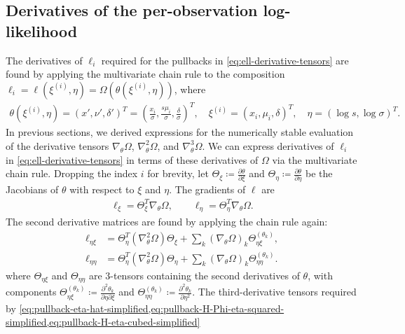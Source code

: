 \documentclass{article}
\begin{document}
\subsection{Derivatives of the per-observation log-likelihood}

The derivatives of $\ell_i$ required for the pullbacks in \cref{eq:ell-derivative-tensors} are found by applying the multivariate chain rule to the composition $\ell_i = \ell(\xi^{(i)}, \eta) = \Omega(\theta(\xi^{(i)}, \eta))$, where
%
\begin{align}
  \theta(\xi^{(i)}, \eta) = (x', \nu', \delta')^T = \left(\frac{x_i}{\sigma}, \frac{s \mu_i}{\sigma}, \frac{\delta}{\sigma}\right)^T,
  \quad
  \xi^{(i)} = (x_i, \mu_i, \delta)^T,
  \quad
  \eta = (\log s, \log \sigma)^T.
\end{align}
%
In previous sections, we derived expressions for the numerically stable evaluation of the derivative tensors $\nabla_\theta \Omega$, $\nabla_\theta^2\Omega$, and $\nabla_\theta^3\Omega$.
We can express derivatives of $\ell_i$ in \cref{eq:ell-derivative-tensors} in terms of these derivatives of $\Omega$ via the multivariate chain rule.
Dropping the index $i$ for brevity, let $\Theta_{\xi} \coloneqq \frac{\partial \theta}{\partial \xi}$ and $\Theta_{\eta} \coloneqq \frac{\partial \theta}{\partial \eta}$ be the Jacobians of $\theta$ with respect to $\xi$ and $\eta$.
The gradients of $\ell$ are
%
\begin{align}
  \ell_{\xi} = \Theta_{\xi}^{T} \nabla_\theta \Omega,
  \qquad
  \ell_{\eta}   = \Theta_{\eta}^{T} \nabla_\theta \Omega.
\end{align}
%
The second derivative matrices are found by applying the chain rule again:
%
\begin{align}
  \ell_{\eta \xi}  & = \Theta_{\eta}^{T} (\nabla_\theta^2 \Omega) \Theta_\xi + \sum_{k} (\nabla_\theta \Omega)_{k} \Theta_{\eta\xi}^{(\theta_k)},   \\
  \ell_{\eta \eta} & = \Theta_{\eta}^{T} (\nabla_\theta^2 \Omega) \Theta_\eta + \sum_{k} (\nabla_\theta \Omega)_{k} \Theta_{\eta\eta}^{(\theta_k)}.
\end{align}
%
where $\Theta_{\eta\xi}$ and $\Theta_{\eta\eta}$ are 3-tensors containing the second derivatives of $\theta$, with components $\Theta_{\eta\xi}^{(\theta_k)} \coloneqq \frac{\partial^2 \theta_k}{\partial \eta \partial \xi}$ and $\Theta_{\eta\eta}^{(\theta_k)} \coloneqq \frac{\partial^2 \theta_k}{\partial \eta^2}$.
The third-derivative tensors required by \cref{eq:pullback-eta-hat-simplified,eq:pullback-H-Phi-eta-squared-simplified,eq:pullback-H-eta-cubed-simplified}
\end{document}
